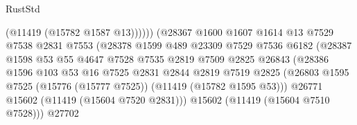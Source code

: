 \begin{lexlean}{RustStd}
\begin{coremodule}
                                              (@11419 (@15782 @1587 @13))))))
                                      (@28367
                                        @1600
                                        @1607
                                        @1614
                                        @13
                                        @7529
                                        @7538
                                        @2831
                                        @7553
                                        (@28378
                                          @1599
                                          @489
                                          @23309
                                          @7529
                                          @7536
                                          @6182
                                          (@28387
                                            @1598
                                            @53
                                            @55
                                            @4647
                                            @7528
                                            @7535
                                            @2819
                                            @7509
                                            @2825
                                            @26843
                                            (@28386
                                              @1596
                                              @103
                                              @53
                                              @16
                                              @7525
                                              @2831
                                              @2844
                                              @2819
                                              @7519
                                              @2825
                                              (@26803
                                                @1595
                                                @7525
                                                (@15776 (@15777 @7525))
                                                (@11419 (@15782 @1595 @53)))
                                              @26771
                                              @15602
                                              (@11419 (@15604 @7520 @2831)))
                                            @15602
                                            (@11419 (@15604 @7510 @7528)))
                                          @27702

\end{coremodule}
\end{lexlean}
